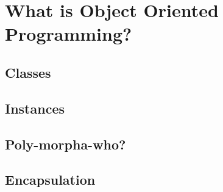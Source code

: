\chapter{What is Object Oriented Programming?}

\section{Classes}
\section{Instances}
\section{Poly-morpha-who?}
\section{Encapsulation}
